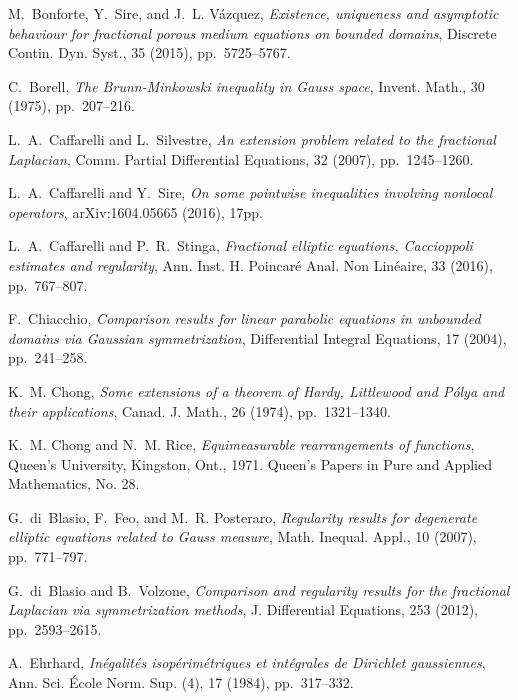 \documentclass[a4paper,10pt,reqno]{amsart}
\numberwithin{equation}{section}
\begin{document}
\begin{thebibliography}{10}
{\sc M.~Bonforte, Y.~Sire, and J.~L. V{\'a}zquez}, {\em Existence, uniqueness
  and asymptotic behaviour for fractional porous medium equations on bounded
  domains}, Discrete Contin. Dyn. Syst., 35 (2015), pp.~5725--5767.

{\sc C.~Borell}, {\em The {B}runn-{M}inkowski inequality in {G}auss space},
  Invent. Math., 30 (1975), pp.~207--216.

{\sc L.~A.~Caffarelli and L.~Silvestre}, {\em An extension problem related to the
  fractional {L}aplacian}, Comm. Partial Differential Equations, 32 (2007),
  pp.~1245--1260.

{\sc L.~A.~Caffarelli and Y.~Sire}, {\em On some pointwise inequalities involving nonlocal operators},
arXiv:1604.05665 (2016), 17pp.

{\sc L.~A.~Caffarelli and P.~R.~Stinga}, {\em Fractional elliptic equations, Caccioppoli estimates and regularity},
Ann. Inst. H. Poincar\'e Anal. Non Lin\'eaire, 33 (2016), pp.~767--807.

{\sc F.~Chiacchio}, {\em Comparison results for linear parabolic equations in
  unbounded domains via {G}aussian symmetrization}, Differential Integral
  Equations, 17 (2004), pp.~241--258.

{\sc K.~M. Chong}, {\em Some extensions of a theorem of {H}ardy, {L}ittlewood
  and {P}\'olya and their applications}, Canad. J. Math., 26 (1974),
  pp.~1321--1340.

{\sc K.~M. Chong and N.~M. Rice}, {\em Equimeasurable rearrangements of
  functions}, Queen's University, Kingston, Ont., 1971.
\newblock Queen's Papers in Pure and Applied Mathematics, No. 28.

{\sc G.~di~Blasio, F.~Feo, and M.~R. Posteraro}, {\em Regularity results for
  degenerate elliptic equations related to {G}auss measure}, Math. Inequal.
  Appl., 10 (2007), pp.~771--797.

{\sc G.~di~Blasio and B.~Volzone}, {\em Comparison and regularity results for
  the fractional {L}aplacian via symmetrization methods}, J. Differential
  Equations, 253 (2012), pp.~2593--2615.

{\sc A.~Ehrhard}, {\em In\'egalit\'es isop\'erim\'etriques et int\'egrales de
  {D}irichlet gaussiennes}, Ann. Sci. \'Ecole Norm. Sup. (4), 17 (1984),
  pp.~317--332.


\end{thebibliography}
\end{document}
